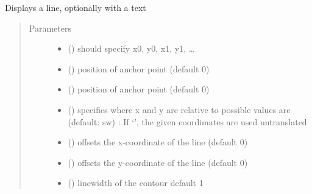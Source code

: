 \documentclass[letterpaper,10pt,english]{sphinxmanual}
\begin{document}
\begin{fulllineitems}
\label{\detokenize{Reference:salabim.AnimateLine}}
Displays a line, optionally with a text
\begin{quote}\begin{description}
\item[{Parameters}] \leavevmode\begin{itemize}
\item {} 
 () \textendash{} should specify x0, y0, x1, y1, …

\item {} 
 () \textendash{} position of anchor point (default 0)

\item {} 
 () \textendash{} position of anchor point (default 0)

\item {} 
 () \textendash{} specifies where x and y are relative to 
possible values are (default: sw) : 
If ‘’, the given coordimates are used untranslated

\item {} 
 () \textendash{} offsets the x-coordinate of the line (default 0)

\item {} 
 () \textendash{} offsets the y-coordinate of the line (default 0)

\item {} 
 () \textendash{} linewidth of the contour 
default 1


\end{itemize}
\end{description}
\end{quote}
\end{fulllineitems}
\end{document}
